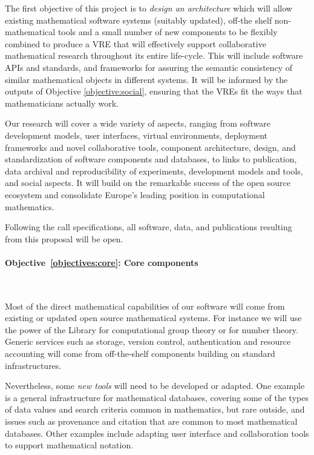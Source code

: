 \documentclass[noworkareas,deliverables,\classoptions]{euproposal}       %
\begin{document}
\begin{proposal}
The first objective of this project is to \emph{design an architecture} which
will allow existing mathematical software systems (suitably updated), 
off-the shelf non-mathematical tools and a small number of new
components to be flexibly combined to produce a VRE that will
effectively support collaborative mathematical research throughout
its entire life-cycle. This will include software APIs and standards,
and frameworks for assuring the semantic consistency of similar
mathematical objects in different systems.  It will be informed by the
outputs of Objective \ref{objective:social}, ensuring that the VREs
fit the ways that mathematicians actually work.


Our research will cover a wide variety of aspects, ranging from
software development models, user interfaces, virtual
environments, deployment frameworks and novel collaborative tools,
component architecture, design, and standardization of software
components and databases, to links to publication, data archival and
reproducibility of experiments, development models and tools, and
social aspects. It will build on the remarkable success of the open
source ecosystem and consolidate Europe's leading position in
computational mathematics.

Following the call specifications, all software, data, and
publications resulting from this proposal will be open.



\paragraph{Objective~\ref{objectives:core}: Core components}\

Most of the direct mathematical capabilities of our software will come
from existing or updated open source mathematical systems. For instance we will
use the power of the \GAP Library for computational group theory or
\PariGP for number theory. Generic services such as storage, version
control, authentication and resource accounting will come from
off-the-shelf components building on standard infrastructures.

Nevertheless, some \emph{new tools} will need to be developed or
adapted. One example is a general infrastructure for mathematical
databases, covering some of the types of data values and search
criteria common in mathematics, but rare outside, and issues such as
provenance and citation that are common to most mathematical
databases. Other examples include adapting user interface and
collaboration tools to support mathematical notation.





\end{proposal}
\end{document}
